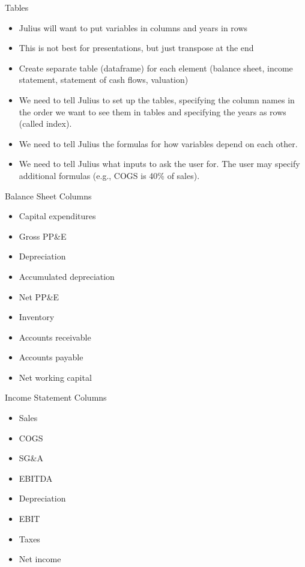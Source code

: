 \documentclass[10pt]{beamer}
\begin{document}
\begin{frame}{Tables}
    \begin{itemize}
        \item Julius will want to put variables in columns and years in rows
        \item This is not best for presentations, but just transpose at the end
        \item Create separate table (dataframe) for each element (balance sheet, income statement, statement of cash flows, valuation)
        \item We need to tell Julius to set up the tables, specifying the column names in the order we want to see them in tables and specifying the years as rows (called index).
        \item We need to tell Julius the formulas for how variables depend on each other.
        \item We need to tell Julius what inputs to ask the user for.  The user may specify additional formulas (e.g., COGS is 40\% of sales).
    \end{itemize}
\end{frame}

\begin{frame}{Balance Sheet Columns}
    \begin{itemize}
        \item Capital expenditures
        \item Gross PP\&E
        \item Depreciation
        \item Accumulated depreciation
        \item Net PP\&E
        \item Inventory
        \item Accounts receivable
        \item Accounts payable
        \item Net working capital
    \end{itemize}
\end{frame}

\begin{frame}{Income Statement Columns}
    \begin{itemize}
        \item Sales
        \item COGS
        \item SG\&A
        \item EBITDA
        \item Depreciation
        \item EBIT
        \item Taxes
        \item Net income
    \end{itemize}
\end{frame}
\end{document}
